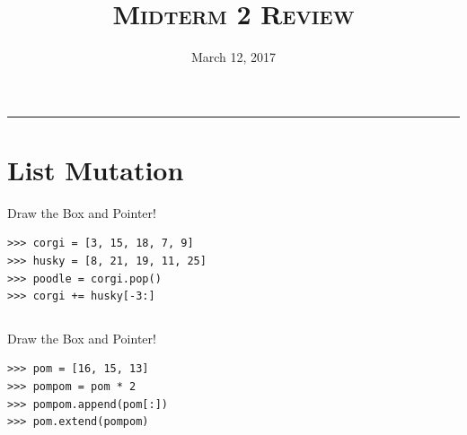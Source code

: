 \documentclass{exam}
\title{\textsc{Midterm 2 Review}}
\date{March 12, 2017}
\begin{document}
\maketitle
\rule{\textwidth}{0.15em}
\fontsize{12}{15}\selectfont




\section{List Mutation}
\begin{questions}

\item Draw the Box and Pointer!
\newline
\begin{lstlisting}
>>> corgi = [3, 15, 18, 7, 9]
>>> husky = [8, 21, 19, 11, 25]
>>> poodle = corgi.pop()
>>> corgi += husky[-3:]
\end{lstlisting}
\begin{solution}
\begin{lstlisting}

\end{lstlisting}
\end{solution}
\vspace{4cm}

\item Draw the Box and Pointer!

\begin{lstlisting}
>>> pom = [16, 15, 13]
>>> pompom = pom * 2
>>> pompom.append(pom[:])
>>> pom.extend(pompom)
\end{lstlisting}

\end{questions}
\clearpage
\end{document}
